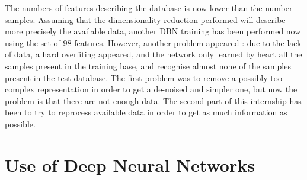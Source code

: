 \documentclass{report}
\begin{document}
	The numbers of features describing the database is now lower than the number samples. Assuming that the dimensionality reduction performed will describe more precisely the available data, another DBN training has been performed now using the set of 98 features. However, another problem appeared : due to the lack of data, a hard overfiting appeared, and the network only learned by heart all the samples present in the training base, and recognise almost none of the samples present in the test database. The first problem was to remove a possibly too complex representation in order to get a de-noised and simpler one, but now the problem is that there are not enough data. The second part of this internship has been to try to reprocess available data in order to get as much information as possible.
	
	\chapter{Use of Deep Neural Networks}
	
	
	
	
\end{document}

